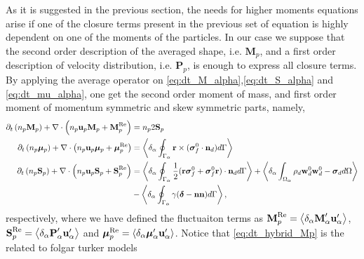 As it is suggested in the previous section, the needs for higher moments equations arise if one of the closure terms present in the previous set of equation is highly dependent on one of the moments of the particles. 
In our case we suppose that the second order description of the averaged shape, i.e. $\textbf{M}_p$, and a first order description of velocity distribution, i.e. $\textbf{P}_p$,  is enough to express all closure terms. 
By applying the average operator on \ref{eq:dt_M_alpha},\ref{eq:dt_S_alpha} and \ref{eq:dt_mu_alpha}, one get the second order moment of mass, and first order moment of momentum symmetric and skew symmetric parts, namely, 
\begin{align}
    \partial_t \left(n_p \textbf{M}_p\right)
    + \mathbf{\nabla}\cdot \left(
        n_p \textbf{u}_p \textbf{M}_p
    + \textbf{M}_p^\text{Re}
    \right)
    &=
    n_p2  \textbf{S}_p
    \label{eq:dt_hybrid_Mp}\\
    \label{eq:dt_hybrid_mup}
    \partial_t \left(n_p \bm{\mu}_p\right)
    + \mathbf{\nabla}\cdot \left(
    n_p \textbf{u}_p \bm{\mu}_p
    + \bm{\mu}_p^\text{Re}
    \right)
    &=
    \left<\delta_\alpha \oint_{\Gamma_\alpha} \textbf{r}\times(\bm\sigma_f^0\cdot \textbf{n}_d) d\Gamma\right>
    \\
\label{eq:dt_hybrid_Sp}
\partial_t \left(n_p \textbf{S}_p\right)
+ \mathbf{\nabla}\cdot \left(
    n_p \textbf{u}_p \textbf{S}_p
+ \textbf{S}_p^\text{Re}
\right)
&=
\left<\delta_\alpha \oint_{\Gamma_\alpha} \frac{1}{2}(\textbf{r}\bm\sigma_f^0+\bm\sigma_f^0\textbf{r})\cdot \textbf{n}_d d\Gamma\right>
+ \left<\delta_\alpha \int_{\Omega_\alpha} 
    \rho_d \textbf{w}_d^0  \textbf{w}_d^0 
    - \bm{\sigma}_d
 d\Omega\right>\nonumber\\
&-  \left<\delta_\alpha \oint_{\Gamma_\alpha} \gamma (\bm\delta - \textbf{nn}) d\Gamma\right>,
\end{align}
respectively, where we have defined the fluctuaiton terms as $
 \textbf{M}_p^\text{Re}
 = \left<\delta_\alpha \textbf{M}_\alpha' \textbf{u}_\alpha'\right> $,  $ 
 \textbf{S}_p^\text{Re}
 = \left<\delta_\alpha \textbf{P}_\alpha' \textbf{u}_\alpha'\right>$ and $ 
 \bm{\mu}_p^\text{Re}
 = \left<\delta_\alpha \bm{\mu}_\alpha' \textbf{u}_\alpha'\right>
$.
Notice that \ref{eq:dt_hybrid_Mp} is the related to folgar turker models



